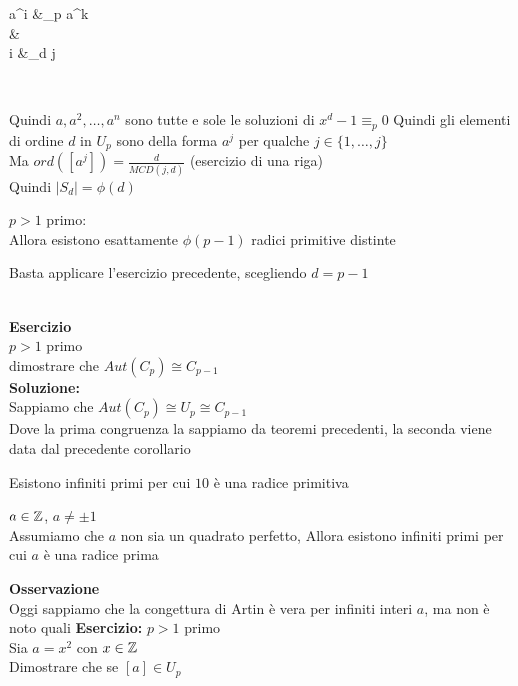 \documentclass[12px]{article}
\begin{document}
{\begin{dimo}[Soluzione]
\begin{center}
	 \begin{aligned}
		 a^i &\equiv_p a^k \\
		     &\storto \Leftrightarrow\\
		 i &\equiv_d j
	 \end{aligned}\\
	\end{center}
	 Quindi $a,a^2,\ldots, a^n$ sono tutte e sole le soluzioni di  $x^d - 1\equiv_p 0$ Quindi gli elementi di ordine  $d$ in $U_p$ sono della forma $a^j$ per qualche $j\in \{1,\ldots, j\}$\\
	 Ma  $ord([a^j]) = \frac{d}{MCD(j,d)}$ (esercizio di una riga) \\
	 Quindi $|S_d| = \phi(d)$

\end{dimo}
\begin{coro}[Esercizio]
	$p > 1 $ primo:\\
	Allora esistono esattamente $ \phi(p-1)$ radici primitive distinte
\end{coro}
\begin{dimo}[Soluzione]
	Basta applicare l'esercizio precedente, scegliendo $d = p-1$
\end{dimo}
\hline\ \\
\textbf{Esercizio}\\
$p> 1$ primo\\
dimostrare che  $Aut(C_p)\cong C_{p-1}$\\
\textbf{Soluzione:}\\
Sappiamo che $Aut(C_p)\cong U_p\cong C_{p-1}$\\
Dove la prima congruenza la sappiamo da teoremi precedenti, la seconda viene data dal precedente corollario\\
\begin{congettura}[Gauss, 1801]
	Esistono infiniti primi per cui $10$ è una radice primitiva
\end{congettura}
\begin{congettura}[E. Artin, 1927]
	$a\in\mathbb{Z}$,  $a\neq \pm 1$\\
	Assumiamo che  $a$ non sia un quadrato perfetto, Allora esistono infiniti primi per cui $a $ è una radice prima
\end{congettura}
\textbf{Osservazione}\\
Oggi sappiamo che la congettura di Artin è vera per infiniti interi $a$, ma non è noto quali
\textbf{Esercizio:}
$p > 1$ primo\\
Sia  $a = x^2$ con  $x\in\mathbb{Z}$\\
Dimostrare che se  $[a]\in U_p$\\
}
\end{document}
